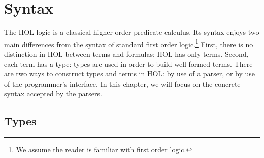 \chapter{Syntax}
{
 \newcommand{\term}       {\mbox{\it term}}
 \newcommand{\IMP}       {\mbox{\tt ==>}}
 \newcommand{\ALL}       {\mbox{\tt !}}
 \newcommand{\EXISTS}       {\mbox{\tt ?}}
 \newcommand{\CHOOSE}       {\mbox{\tt @}}
 \newcommand{\EXISTSONE}       {\mbox{\tt ?!}}
 \newcommand{\LET}       {\mbox{\tt let}}
 \newcommand{\und}       {\mbox{\tt and}}
 \newcommand{\IN}       {\mbox{\tt in}}
 \newcommand{\CONS}       {\mbox{\tt CONS}}
 \newcommand{\INSERT}    {\mbox{\tt INSERT}}
 \newcommand{\SUC}       {\mbox{\tt SUC}}
 \newcommand{\vstr}       {\mbox{\it vstr}}
 \newcommand{\numeral}    {\mbox{\it numeral}}
 \newcommand{\charseq}    {\mbox{\it charseq}}

The HOL logic is a classical higher-order predicate calculus. Its
syntax enjoys two main differences from the syntax of standard first
order logic.\footnote{We assume the reader is familiar with first
  order logic.}  First, there is no distinction in HOL between terms
and formulas: HOL has only terms. Second, each term has a type: types
are used in order to build well-formed terms. There are two ways to
construct types and terms in HOL: by use of a parser, or by use of the
programmer's interface. In this chapter, we will focus on the concrete
syntax accepted by the parsers.


\section{Types}

}
